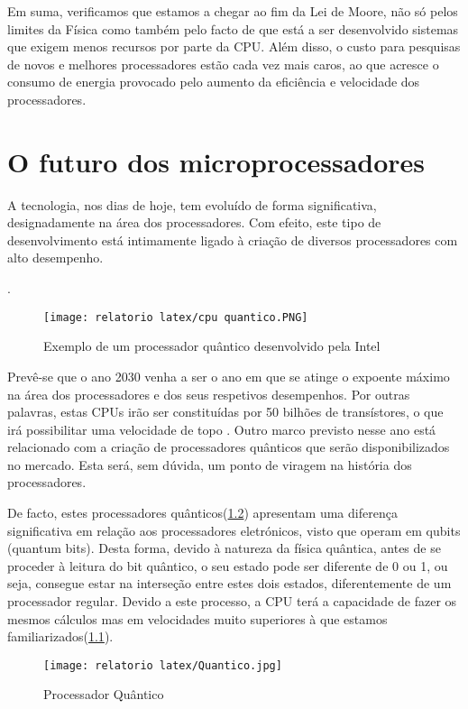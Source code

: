\documentclass{report}
\begin{document}
Em suma, verificamos que estamos a chegar ao fim da Lei de Moore, não só pelos limites da Física como também pelo facto de que está a ser desenvolvido sistemas que exigem menos recursos por parte da \ac{CPU}. Além disso, o custo para pesquisas de novos e melhores processadores estão cada vez mais caros, ao que acresce o consumo de energia provocado pelo aumento da eficiência e velocidade dos processadores\cite{Lei2}.


\chapter{O futuro dos microprocessadores}
\label{chap.O futuro dos microprocessadores}

A tecnologia, nos dias de hoje, tem evoluído de forma significativa, designadamente na área dos processadores. Com efeito, este tipo de desenvolvimento está intimamente ligado à criação de diversos processadores com alto desempenho. 


\cite{Blog2} . 
\begin{figure}[h!]
\centering
  \texttt{[image: relatorio latex/cpu quantico.PNG]}
  \caption{Exemplo de um processador quântico desenvolvido pela \ac{Intel}}
  \label{fig:cpu_q}
\end{figure}


Prevê-se que o ano 2030 venha a ser o ano em que se atinge  o expoente máximo na área dos processadores e dos seus respetivos desempenhos. Por outras palavras, estas \ac{CPU}s irão ser constituídas por 50 bilhões de transístores, o que irá possibilitar uma velocidade de topo \cite{Blog2}.
Outro marco previsto nesse ano está relacionado com a criação de processadores quânticos que serão disponibilizados no mercado. Esta será, sem dúvida, um ponto de viragem na história dos processadores\cite{Blog1}.

De facto, estes processadores quânticos(\ref{fig:Quantico}) apresentam uma diferença significativa em relação aos processadores eletrónicos, visto que  operam em qubits (quantum bits). Desta forma, devido à natureza da física quântica, antes de se proceder à leitura do bit quântico, o seu estado pode ser diferente de 0 ou 1, ou seja, consegue estar na interseção entre estes dois estados, diferentemente de um processador regular. Devido a este processo, a \ac{CPU} terá a capacidade de fazer os mesmos cálculos mas em velocidades muito superiores à que estamos familiarizados(\ref{fig:cpu_q})\cite{Blog1}.
\begin{figure}[h!]
\centering
  \texttt{[image: relatorio latex/Quantico.jpg]}
  \caption{Processador Quântico}
  \label{fig:Quantico}
\end{figure}
\end{document}
